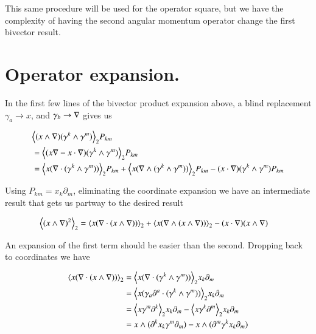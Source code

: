 This same procedure will be used for the operator square, but we have the complexity of having the second angular momentum operator change the first bivector result.

\section{Operator expansion.}

In the first few lines of the bivector product expansion above, a blind replacement $\gamma_a \rightarrow x$, and $\gamma_b \rightarrow \nabla$ gives us

\begin{align*}
&{\left\langle{{ (x \wedge \nabla) (\gamma^k \wedge \gamma^m) }}\right\rangle}_{2} P_{km}  \\
&= 
{\left\langle{{ (x \nabla- x \cdot \nabla) (\gamma^k \wedge \gamma^m) }}\right\rangle}_{2} P_{km} \\
&= 
{\left\langle{{ x (\nabla\cdot (\gamma^k \wedge \gamma^m)) }}\right\rangle}_{2} P_{km} 
+ {\left\langle{{ x (\nabla\wedge (\gamma^k \wedge \gamma^m)) }}\right\rangle}_{2} P_{km} 
- (x \cdot \nabla) (\gamma^k \wedge \gamma^m) P_{km} \\
\end{align*}

Using $P_{km} = x_k \partial_m$, eliminating the coordinate expansion we have an intermediate result that gets us partway to the desired result

\begin{align}\label{eqn:bivectorSelect:goo2}
{\left\langle{{ (x \wedge \nabla)^2 }}\right\rangle}_{2}
&=
{\left\langle{{ x (\nabla\cdot (x \wedge \nabla)) }}\right\rangle}_{2} 
+ {\left\langle{{ x (\nabla\wedge (x \wedge \nabla)) }}\right\rangle}_{2} 
- (x \cdot \nabla) (x \wedge \nabla) 
\end{align}

An expansion of the first term should be easier than the second.  Dropping back to coordinates we have

\begin{align*}
{\left\langle{{ x (\nabla\cdot (x \wedge \nabla)) }}\right\rangle}_{2} 
&=
{\left\langle{{ x (\nabla\cdot (\gamma^k \wedge \gamma^m)) }}\right\rangle}_{2} x_k \partial_m \\
&=
{\left\langle{{ x (\gamma_a \partial^a \cdot (\gamma^k \wedge \gamma^m)) }}\right\rangle}_{2} x_k \partial_m \\
&=
{\left\langle{{ x \gamma^m \partial^k }}\right\rangle}_{2} x_k \partial_m 
-{\left\langle{{ x \gamma^k \partial^m }}\right\rangle}_{2} x_k \partial_m  \\
&=
x \wedge (\partial^k x_k \gamma^m \partial_m )
- x \wedge (\partial^m \gamma^k x_k \partial_m ) \\
\end{align*}

